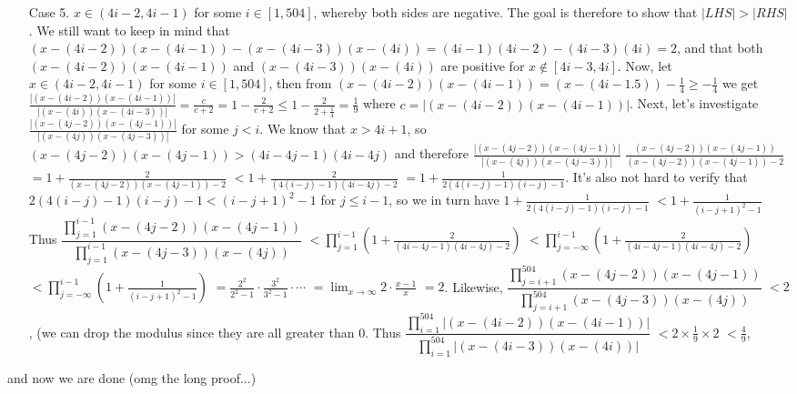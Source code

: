 \documentclass[11pt,a4paper]{article}
\begin{document}
\begin{itemize}
\begin{itemize}
\item [Case 5.]
$x\in (4i-2, 4i-1)$ for some $i\in [1, 504]$, whereby both sides are negative. 
The goal is therefore to show that $|LHS|>|RHS|$.  
We still want to keep in mind that $(x-(4i-2))(x-(4i-1))-(x-(4i-3))(x-(4i))=(4i-1)(4i-2)-(4i-3)(4i)=2$, 
and that both $(x-(4i-2))(x-(4i-1))$ and $(x-(4i-3))(x-(4i))$ are positive for $x\not\in [4i-3, 4i]$. 
Now, let $x\in (4i-2, 4i-1)$ for some $i\in [1, 504]$, 
then from $(x-(4i-2))(x-(4i-1))=(x-(4i-1.5))-\frac 14\ge -\frac 14$ we get 
$\frac{|(x-(4i-2))(x-(4i-1))|}{|(x-(4i))(x-(4i-3))|}=\frac{c}{c+2}=1-\frac{2}{c+2}\le 1-\frac 2{2+\frac 14}=\frac 19$ where $c=|(x-(4i-2))(x-(4i-1))|$. 
Next, let's investigate $\frac{|(x-(4j-2))(x-(4j-1))|}{|(x-(4j))(x-(4j-3))|}$ 
for some $j<i$. 
We know that $x>4i+1$, so 
$(x-(4j-2))(x-(4j-1))> (4i-4j-1)(4i-4j)$ 
and therefore 
$\frac{|(x-(4j-2))(x-(4j-1))|}{|(x-(4j))(x-(4j-3))|}$
$\frac{(x-(4j-2))(x-(4j-1))}{(x-(4j-2))(x-(4j-1))-2}$
$=1+\frac 2{(x-(4j-2))(x-(4j-1))-2}$
$<1+\frac 2{(4(i-j)-1)(4i-4j)-2}$
$=1+\frac 1{2(4(i-j)-1)(i-j)-1}$. 
It's also not hard to verify that $2(4(i-j)-1)(i-j)-1<(i-j+1)^2-1$ for $j\le i-1$, so we in turn have 
$ 1+\frac 1{2(4(i-j)-1)(i-j)-1}$
$<1+\frac 1{(i-j+1)^2-1}$
Thus $\dfrac{\displaystyle\prod_{j=1}^{i-1} (x-(4j-2))(x-(4j-1))}{\displaystyle\prod_{j=1}^{i-1} (x-(4j-3))(x-(4j))}$
$<\displaystyle\prod_{j=1}^{i-1}(1+\frac 2{(4i-4j-1)(4i-4j)-2})$
$<\displaystyle\prod_{j=-\infty}^{i-1}(1+\frac 2{(4i-4j-1)(4i-4j)-2})$
$<\displaystyle\prod_{j=-\infty}^{i-1}(1+\frac 1{(i-j+1)^2-1})$
$=\frac{2^2}{2^2-1}\cdot\frac{3^2}{3^2-1}\cdot\cdots$
$=\lim_{x\to\infty}2\cdot \frac{x-1}{x}$
$=2$. 
Likewise, $\dfrac{\displaystyle\prod_{j=i+1}^{504} (x-(4j-2))(x-(4j-1))}{\displaystyle\prod_{j=i+1}^{504} (x-(4j-3))(x-(4j))}$
$<2$, 
(we can drop the modulus since they are all greater than 0. 
Thus $\dfrac{\displaystyle\prod_{i=1}^{504} |(x-(4i-2))(x-(4i-1))|}{\displaystyle\prod_{i=1}^{504} |(x-(4i-3))(x-(4i))|}$
$<2\times \frac{1}{9}\times 2$
$<\frac 49$, 

\end{itemize}
and now we are done (omg the long proof...)

\end{itemize}
\end{document}
